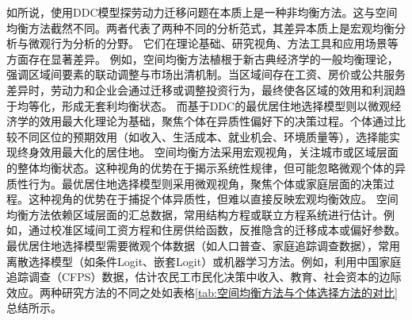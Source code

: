 \documentclass[a4paper, zihao=-4, fontset = mac, oneside]{ctexbook} %
\begin{document}
如\textcite{jiaEconomicsInternalMigration2023}所说，使用DDC模型探劳动力迁移问题在本质上是一种非均衡方法。这与空间均衡方法截然不同。两者代表了两种不同的分析范式，其差异本质上是宏观均衡分析与微观行为分析的分野。
它们在理论基础、研究视角、方法工具和应用场景等方面存在显著差异。
例如，空间均衡方法植根于新古典经济学的一般均衡理论，强调区域间要素的联动调整与市场出清机制。当区域间存在工资、房价或公共服务差异时，劳动力和企业会通过迁移或调整投资行为，最终使各区域的效用和利润趋于均等化，形成无套利均衡状态。
而基于DDC的最优居住地选择模型则以微观经济学的效用最大化理论为基础，聚焦个体在异质性偏好下的决策过程。个体通过比较不同区位的预期效用（如收入、生活成本、就业机会、环境质量等），选择能实现终身效用最大化的居住地。
空间均衡方法采用宏观视角，关注城市或区域层面的整体均衡状态。这种视角的优势在于揭示系统性规律，但可能忽略微观个体的异质性行为。最优居住地选择模型则采用微观视角，聚焦个体或家庭层面的决策过程。这种视角的优势在于捕捉个体异质性，但难以直接反映宏观均衡效应。
空间均衡方法依赖区域层面的汇总数据，常用结构方程或联立方程系统进行估计。例如，通过校准区域间工资方程和住房供给函数，反推隐含的迁移成本或偏好参数。最优居住地选择模型需要微观个体数据（如人口普查、家庭追踪调查数据），常用离散选择模型（如条件Logit、嵌套Logit）或机器学习方法。例如，利用中国家庭追踪调查（CFPS）数据，估计农民工市民化决策中收入、教育、社会资本的边际效应。两种研究方法的不同之处如表格\ref{tab:空间均衡方法与个体选择方法的对比}总结所示。
\end{document}
